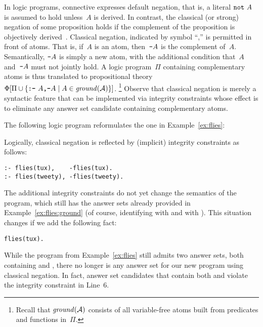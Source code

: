 In logic programs, connective  expresses default negation,
that is, a literal $\texttt{not}~A$ is assumed to hold unless~$A$ is derived.
In contrast, the classical (or strong) negation of some proposition
holds if the complement of the proposition is objectively derived~\cite{gellif91a}.
Classical negation, indicated by symbol ``\code{-},'' is permitted in front of atoms.
That is, if~$A$ is an atom, then~$\texttt{-}A$ is the complement of~$A$.
Semantically, $\texttt{-}A$ is simply a new atom,
with the additional condition that~$A$ and~$\texttt{-}A$ must not jointly hold.
A logic program~$\Pi$ containing complementary atoms is thus translated
to propositional theory
$\Phi[\Pi \cup \{\texttt{:-}~A\texttt{,}\texttt{-}A \mid A\in\mathit{ground}(\mathcal{A})\}]$.%
\footnote{Recall that $\mathit{ground}(\mathcal{A})$ consists of all variable-free atoms
built from predicates and functions in~$\Pi$.}
Observe that classical negation is merely a syntactic feature that can be
implemented via integrity constraints whose effect is to eliminate
any answer set candidate containing complementary atoms.

\begin{example}\label{ex:flies:neg}
The following logic program reformulates the one in Example~\ref{ex:flies}:
%


%
Logically, classical negation is reflected by
(implicit) integrity constraints as follows:%
%
\begin{lstlisting}[firstnumber=6]
:- flies(tux),    -flies(tux).
:- flies(tweety), -flies(tweety).
\end{lstlisting}
The additional integrity constraints do not yet change the semantics of the
program, which still has the answer sets already provided in Example~\ref{ex:flies:ground}
(of course, identifying
 with
 and
 with
).
This situation changes if we add the following fact:
\begin{lstlisting}[firstnumber=8]
flies(tux).
\end{lstlisting}
While the program from Example~\ref{ex:flies} still admits two answer sets,
both containing 
 and
,
there no longer is any answer set for our new program using classical negation.
In fact, answer set candidates that contain both
 and
 violate the integrity constraint in Line~6.
\eexample
\end{example}


